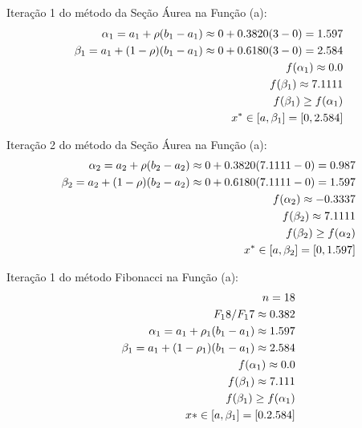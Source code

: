 \documentclass[fleqn, 11pt]{article}
\begin{document}
\hfill Iteração 1 do método da Seção Áurea na Função (a):
\begin{align*}
\begin{split}
\hfill \alpha_1 = a_1 + \rho (b_1-a_1) \approx 0 + 0.3820 (3-0) = 1.597 \\
\hfill \beta_1 = a_1 + (1 - \rho) (b_1 - a_1) \approx 0 + 0.6180 (3 - 0) = 2.584 \\
\hfill f(\alpha_1) \approx 0.0 \\ 
\hfill f(\beta_1) \approx   7.1111  \\
\hfill f(\beta_1) \geq f(\alpha_1) \\
\hfill x^* \in [a, \beta_1] = [0, 2.584]
\end{split}
\end{align*}
\newline

\hfill Iteração 2 do método da Seção Áurea na Função (a):
\begin{align*}
\begin{split}
\hfill \alpha_2 = a_2 + \rho (b_2-a_2) \approx 0 + 0.3820 (7.1111-0) = 0.987 \\
\hfill \beta_2 = a_2 + (1 - \rho) (b_2 - a_2) \approx 0 + 0.6180 (7.1111 - 0) = 1.597 \\
\hfill f(\alpha_2) \approx -0.3337 \\ 
\hfill f(\beta_2) \approx   7.1111  \\
\hfill f(\beta_2) \geq f(\alpha_2) \\
\hfill x^* \in [a, \beta_2] = [0, 1.597]
\end{split}
\end{align*}
\newline

\hfill Iteração 1 do método Fibonacci na Função (a):
\begin{align*}
\begin{split}
\hfill n = 18 \\
\hfill F_18/F_17 \approx 0.382 \\
\hfill \alpha_1 = a_1 + \rho_1 (b_1 - a_1) \approx 1.597 \\
\hfill \beta_1 = a_1 + (1 - \rho_1) (b_1 - a_1) \approx 2.584 \\
\hfill f(\alpha_1) \approx 0.0 \\
\hfill f(\beta_1) \approx 7.111 \\
\hfill f(\beta_1) \geq f(\alpha_1) \\
\hfill x* \in [a, \beta_1] = [0. 2.584]
\end{split}
\end{align*}
\end{document}
